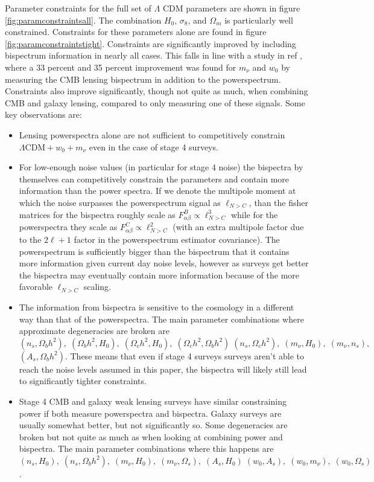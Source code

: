 \documentclass[11pt]{article} %
\begin{document}
Parameter constraints for the full set of $\Lambda$ CDM parameters are shown in figure \ref{fig:paramconstraintsall}. The combination $H_0$, $\sigma_8$, and $\Omega_m$ is particularly well constrained. Constraints for these parameters alone are found in figure \ref{fig:paramconstraintstight}. Constraints are significantly improved by including bispectrum information in nearly all cases. This falls in line with a study in ref \cite{Namikawa_2016}, where a 33 percent and 35 percent improvement was found for $m_\nu$ and $w_0$ by measuring the CMB lensing bispectrum in addition to the powerspectrum. Constraints also improve significantly, though not quite as much, when combining CMB and galaxy lensing, compared to only measuring one of these signals. Some key observations are:
\begin{itemize}
    \item Lensing powerspectra alone are not sufficient to competitively constrain $\Lambda\mathrm{CDM} + w_0 + m_\nu$ even in the case of stage 4 surveys.
    \item For low-enough noise values (in particular for stage 4 noise) the bispectra by themselves can competitively constrain the parameters and contain more information than the power spectra. If we denote the multipole moment at which the noise surpasses the powerspectrum signal as $\ell_{N>C}$, than the fisher matrices for the bispectra roughly scale as $F^{B}_{\alpha\beta}\propto \ell_{N>C}^3$ while for the powerspectra they scale as $F^{C}_{\alpha\beta}\propto \ell_{N>C}^2$ (with an extra multipole factor due to the $2\ell + 1$ factor in the powerspectrum estimator covariance). The powerspectrum is sufficiently bigger than the bispectrum that it contains more information given current day noise levels, however as surveys get better the bispectra may eventually contain more information because of the more favorable $\ell_{N>C}$ scaling.

    \item The information from bispectra is sensitive to the cosmology in a different way than that of the powerspectra. The main parameter combinations where approximate degeneracies are broken are $(n_s,\Omega_b h^2),\;(\Omega_b h^2,H_0),\;(\Omega_c h^2,H_0),\;(\Omega_c h^2,\Omega_b h^2)\;(n_s,\Omega_c h^2),\;(m_\nu,H_0),\;(m_\nu,n_s),$ $(A_s,\Omega_b h^2)$. These means that even if stage 4 surveys surveys aren't able to reach the noise levels assumed in this paper, the bispectra will likely still lead to significantly tighter constraints.

    \item Stage 4 CMB and galaxy weak lensing surveys have similar constraining power if both measure powerspectra and bispectra. Galaxy surveys are usually somewhat better, but not significantly so. Some degeneracies are broken but not quite as much as when looking at combining power and bispectra. The main parameter combinations where this happens are  $(n_s, H_0),\;(n_s,\Omega_b h^2),\;(m_\nu,H_0),\;(m_\nu,\Omega_s),\;(A_s,H_0)\;(w_0,A_s),\;(w_0, m_\nu),\;(w_0,\Omega_s)$.
  \end{itemize}
  
\end{document}
